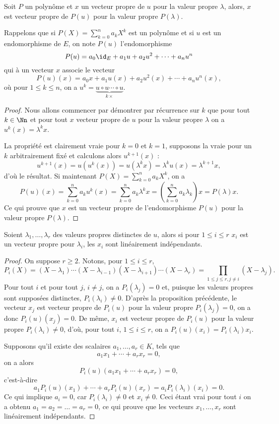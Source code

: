 \documentclass[class=report,crop=false]{standalone}
\begin{document}
\begin{proposition}
Soit $P$ un polynôme et $x$ un vecteur propre de $u$ pour la valeur propre $\lambda$,
alors, $x$ est vecteur propre de $P(u)$ pour la valeur propre $P(\lambda)$.
\end{proposition} 

Rappelons que si $P(X)=\sum_{k=0}^n a_k X^k$ est un polynôme et si $u$ est un endomorphisme de $E$, on note $P(u)$ l'endomorphisme
$$P(u)=a_0 \id_E+a_1 u+a_2 u^2+\cdots+a_n u^n$$
qui à un vecteur $x$ associe le vecteur
$$P(u)(x)=a_0 x+a_1 u(x)+a_2 u^2(x)+\cdots+a_n u^n(x),$$
où pour $1\leq k\leq n$, on a $u^k=\underbrace{u\circ u\cdots\circ u}_{k\times}$.

\begin{proof}
Nous allons commencer par  démontrer par récurrence sur $k$ que pour tout $k\in\Nn$ et pour tout $x$ vecteur propre de $u$ pour la valeur propre $\lambda$ on a $u^k(x)=\lambda^k x$.

La propriété est clairement vraie pour $k=0$ et $k=1$, supposons la vraie pour un $k$ arbitrairement fixé et calculons alors $u^{k+1}(x)$ :
$$u^{k+1}(x)=u(u^k(x))=u(\lambda^k x)=\lambda^k u(x)=\lambda^{k+1} x,$$
d'où le résultat. Si maintenant $P(X)=\sum_{k=0}^n a_k X^k$, on a 
$$P(u)(x)=\sum_{k=0}^n a_ku^k(x)=\sum_{k=0}^n a_k\lambda^k x=\left(\sum_{k=0}^n a_k\lambda_k\right) x=P(\lambda)x.$$
Ce qui prouve que $x$ est un vecteur propre de l'endomorphisme $P(u)$ pour la valeur propre $P(\lambda)$.  
\end{proof}

\begin{theoreme}
Soient $\lambda_1,\dots,\lambda_r$ des valeurs propres distinctes de 
$u$, alors si pour $1\leq i\leq r$ $x_i$ est un vecteur propre pour 
$\lambda_i$, les $x_i$ sont linéairement indépendants.
\end{theoreme}

\begin{proof}
On suppose $r\geq 2$. Notons, pour $1\leq i\leq r$,
$$P_i(X)=(X-\lambda_1)\cdots(X-\lambda_{i-1})(X-\lambda_{i+1})\cdots(X-\lambda_r)=\prod_{1\leq j\leq r,j\neq i}(X-\lambda_j) .$$
Pour tout $i$ et pour tout $j$, $i\neq j$, on a $P_i(\lambda_j)=0$ et,
puisque les valeurs propres sont supposées distinctes, 
$P_i(\lambda_i)\neq 0$. D'après la proposition précédente, 
le vecteur $x_j$ est vecteur propre de $P_i(u)$ pour la valeur 
propre $P_i(\lambda_j)=0$, on a donc $P_i(u)(x_j)=0$. De même, 
$x_i$ est vecteur propre de $P_i(u)$ pour la valeur propre 
$P_i(\lambda_i)\neq0$, d'où, pour tout $i$, $1\leq i\leq r$, 
on a $P_i(u)(x_i)=P_i(\lambda_i)x_i$.

Supposons qu'il existe des scalaires $a_1,\dots,a_r\in K$, tels que 
$$a_1x_1+\cdots+a_rx_r=0,$$
on a alors
$$P_i(u)(a_1x_1+\cdots+a_rx_r)=0,$$
c'est-à-dire
$$a_1P_i(u)(x_1)+\cdots+a_rP_i(u)(x_r)=a_iP_i(\lambda_i)(x_i)=0.$$
Ce qui implique $a_i=0$, car $P_i(\lambda_i)\neq 0$ et $x_i\neq 0$. 
Ceci étant vrai pour tout $i$ on a obtenu $a_1=a_2=\dots=a_r=0$, ce qui prouve que les vecteurs $x_1,\dots,x_r$ sont linéairement indépendants.  
\end{proof}
\end{document}
